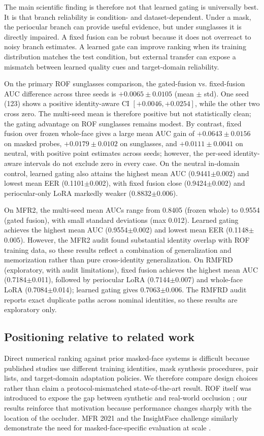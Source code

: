 ﻿\documentclass[10pt,journal,compsoc]{IEEEtran}
\begin{document}
The main scientific finding is therefore not that learned gating is universally best. It is that branch reliability is condition- and dataset-dependent. Under a mask, the periocular branch can provide useful evidence, but under sunglasses it is directly impaired. A fixed fusion can be robust because it does not overreact to noisy branch estimates. A learned gate can improve ranking when its training distribution matches the test condition, but external transfer can expose a mismatch between learned quality cues and target-domain reliability.

On the primary ROF sunglasses comparison, the gated-fusion vs. fixed-fusion AUC difference across three seeds is $+0.0065\pm0.0105$ (mean $\pm$ std). One seed (123) shows a positive identity-aware CI $[+0.0046, +0.0254]$, while the other two cross zero. The multi-seed mean is therefore positive but not statistically clean; the gating advantage on ROF sunglasses remains modest. By contrast, fixed fusion over frozen whole-face gives a large mean AUC gain of $+0.0643\pm0.0156$ on masked probes, $+0.0179\pm0.0102$ on sunglasses, and $+0.0111\pm0.0041$ on neutral, with positive point estimates across seeds; however, the per-seed identity-aware intervals do not exclude zero in every case. On the neutral in-domain control, learned gating also attains the highest mean AUC (0.9441$\pm$0.002) and lowest mean EER (0.1101$\pm$0.002), with fixed fusion close (0.9424$\pm$0.002) and periocular-only LoRA markedly weaker (0.8832$\pm$0.006).

On MFR2, the multi-seed mean AUCs range from 0.8405 (frozen whole) to 0.9554 (gated fusion), with small standard deviations (max 0.012). Learned gating achieves the highest mean AUC (0.9554$\pm$0.002) and lowest mean EER (0.1148$\pm$0.005). However, the MFR2 audit found substantial identity overlap with ROF training data, so these results reflect a combination of generalization and memorization rather than pure cross-identity generalization. On RMFRD (exploratory, with audit limitations), fixed fusion achieves the highest mean AUC (0.7184$\pm$0.011), followed by periocular LoRA (0.7144$\pm$0.007) and whole-face LoRA (0.7084$\pm$0.014); learned gating gives 0.7063$\pm$0.006. The RMFRD audit reports exact duplicate paths across nominal identities, so these results are exploratory only.

\subsection{Positioning relative to related work}
Direct numerical ranking against prior masked-face systems is difficult because published studies use different training identities, mask synthesis procedures, pair lists, and target-domain adaptation policies. We therefore compare design choices rather than claim a protocol-mismatched state-of-the-art result. ROF itself was introduced to expose the gap between synthetic and real-world occlusion \cite{rof}; our results reinforce that motivation because performance changes sharply with the location of the occluder. MFR 2021 and the InsightFace challenge similarly demonstrate the need for masked-face-specific evaluation at scale \cite{mfr2021,insightfacemfr}.
\end{document}
